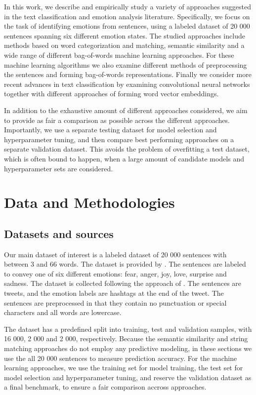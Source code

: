 \documentclass[conference]{IEEEtran}
\begin{document}
In this work, we describe and empirically study a variety of approaches suggested in the text classification and emotion analysis literature. Specifically, we focus on the task of identifying emotions from sentences, using a labeled dataset of 20 000 sentences spanning six different emotion states. The studied approaches include methods based on word categorization and matching, semantic similarity and a wide range of different bag-of-words machine learning approaches. For these machine learning algorithms we also examine different methods of  preprocessing the sentences and forming bag-of-words representations. Finally we consider more recent advances in text classification by examining convolutional neural networks together with different approaches of forming word vector embeddings. 

In addition to the exhaustive amount of different approaches considered, we aim to provide as fair a comparison as possible across the different approaches. Importantly, we use a separate testing dataset for model selection and hyperparameter tuning, and then compare best performing approaches on a separate validation dataset. This avoids the problem of overfitting a test dataset, which is often bound to happen, when a large amount of candidate models and hyperparameter sets are considered.

\section{Data and Methodologies}
\subsection{Datasets and sources}
Our main dataset of interest is a labeled dataset of 20 000 sentences with between 3 and 66 words. The dataset is provided by \cite{kaggledata}. The sentences are labeled to convey one of six different emotions: fear, anger, joy, love, surprise and sadness. The dataset is collected following the approach of \cite{saravia-etal-2018-carer}. The sentences are tweets, and the emotion labels are hashtags at the end of the tweet. The sentences are preprocessed in that they contain no punctuation or special characters and all words are lowercase.

The dataset has a predefined split into training, test and validation samples, with 16 000, 2 000 and 2 000, respectively. Because the semantic similarity and string matching approaches do not employ any predictive modeling, in these sections we use the all 20 000 sentences to measure prediction accuracy. For the machine learning approaches, we use the training set for model training, the test set for model selection and hyperparameter tuning, and reserve the validation dataset as a final benchmark, to ensure a fair comparison accross approaches.
\end{document}
